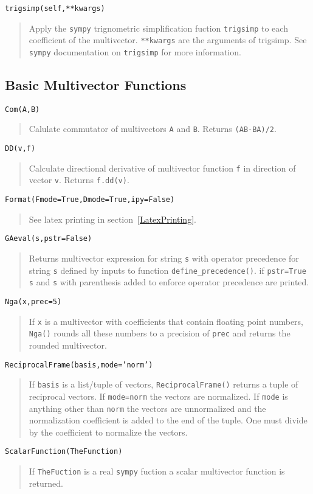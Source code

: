 \documentclass[10pt]{article}
\newcommand{\T}[1]{\texttt{#1}}
\begin{document}
\T{trigsimp(self,**kwargs)}
\begin{quote}
   Apply the \T{sympy} trignometric simplification fuction \T{trigsimp} to
   each coefficient of the multivector. \T{**kwargs} are the arguments of
   trigsimp.  See \T{sympy} documentation on \T{trigsimp} for more information.
\end{quote}

\subsection{Basic Multivector Functions}

\T{Com(A,B)}
\begin{quote}
   Calulate commutator of multivectors \T{A} and \T{B}.  Returns \T{(AB-BA)/2}.
\end{quote}
\T{DD(v,f)}
\begin{quote}
   Calculate directional derivative of multivector function \T{f} in direction of
   vector \T{v}.  Returns \T{f.dd(v)}.
\end{quote}
\T{Format(Fmode=True,Dmode=True,ipy=False)}
\begin{quote}
   See latex printing in section~\ref{LatexPrinting}.
\end{quote}
\T{GAeval(s,pstr=False)}
\begin{quote}
   Returns multivector expression for string \T{s} with operator precedence for
   string \T{s} defined by inputs to function \T{define\_precedence()}.  if \T{pstr=True}
   \T{s} and \T{s} with parenthesis added to enforce operator precedence are printed.
\end{quote}
\T{Nga(x,prec=5)}
\begin{quote}
   If \T{x} is a multivector with coefficients that contain floating point numbers, \T{Nga()}
   rounds all these numbers to a precision of \T{prec} and returns the rounded multivector.
\end{quote}
\T{ReciprocalFrame(basis,mode='norm')}
\begin{quote}
   If \T{basis} is a list/tuple of vectors, \T{ReciprocalFrame()} returns a tuple of reciprocal
   vectors.  If \T{mode=norm} the vectors are normalized.  If \T{mode} is anything other than
   \T{norm} the vectors are unnormalized and the normalization coefficient is added to the
   end of the tuple.  One must divide by the coefficient to normalize the vectors.
\end{quote}
\T{ScalarFunction(TheFunction)}
\begin{quote}
   If \T{TheFuction} is a real \T{sympy} fuction a scalar multivector function is returned.
\end{quote}
\end{document}
